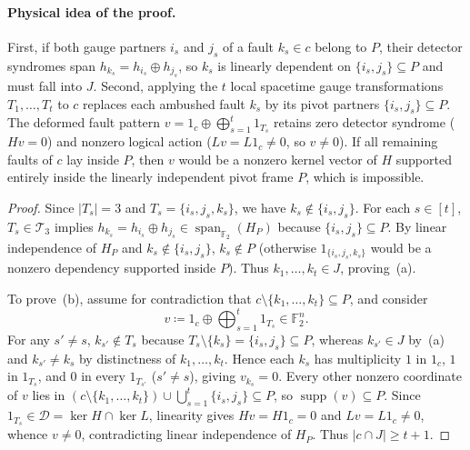 \documentclass[12pt]{article}
\theoremstyle{definition}
\newcommand{\Ftwo}{\mathbb{F}_2}
\DeclareMathOperator{\supp}{supp}
\newcommand{\Dc}{\mathcal{D}}
\newcommand{\Tc}{\mathcal{T}_3}
\begin{document}
\paragraph{Physical idea of the proof.}
First, if both gauge partners $i_s$ and $j_s$ of a fault $k_s \in c$ belong to $P$, their detector syndromes span
$h_{k_s} = h_{i_s} \oplus h_{j_s}$, so $k_s$ is linearly dependent on $\{i_s, j_s\} \subseteq P$ and must fall into
$J$. Second, applying the $t$ local spacetime gauge transformations $T_1, \dots, T_t$ to $c$ replaces each ambushed
fault $k_s$ by its pivot partners $\{i_s, j_s\} \subseteq P$. The deformed fault pattern $v = 1_c \oplus
\bigoplus_{s=1}^t 1_{T_s}$ retains zero detector syndrome ($H v = 0$) and nonzero logical action ($L v = L 1_c \neq
0$, so $v \neq 0$). If all remaining faults of $c$ lay inside $P$, then $v$ would be a nonzero kernel vector of $H$
supported entirely inside the linearly independent pivot frame $P$, which is impossible.

\begin{proof}
Since $|T_s| = 3$ and $T_s = \{i_s, j_s, k_s\}$, we have $k_s \notin \{i_s, j_s\}$. For each $s \in [t]$, $T_s \in
\Tc$ implies $h_{k_s} = h_{i_s} \oplus h_{j_s} \in \operatorname{span}_{\Ftwo}(H_P)$ because $\{i_s, j_s\}
\subseteq P$. By linear independence of $H_P$ and $k_s \notin \{i_s, j_s\}$, $k_s \notin P$ (otherwise
$1_{\{i_s, j_s, k_s\}}$ would be a nonzero dependency supported inside $P$). Thus $k_1, \dots, k_t \in J$,
proving~(a).

To prove~(b), assume for contradiction that $c \setminus \{k_1, \dots, k_t\} \subseteq P$, and consider
\[
  v \coloneqq 1_c \oplus \bigoplus_{s=1}^t 1_{T_s} \in \Ftwo^n.
\]
For any $s' \neq s$, $k_{s'} \notin T_s$ because $T_s \setminus \{k_s\} = \{i_s, j_s\} \subseteq P$, whereas
$k_{s'} \in J$ by~(a) and $k_{s'} \neq k_s$ by distinctness of $k_1, \dots, k_t$. Hence each $k_s$ has multiplicity
$1$ in $1_c$, $1$ in $1_{T_s}$, and $0$ in every $1_{T_{s'}}$ ($s' \neq s$), giving $v_{k_s} = 0$. Every other
nonzero coordinate of $v$ lies in $(c \setminus \{k_1, \dots, k_t\}) \cup \bigcup_{s=1}^t \{i_s, j_s\} \subseteq
P$, so $\supp(v) \subseteq P$. Since $1_{T_s} \in \Dc = \ker H \cap \ker L$, linearity gives $H v = H 1_c = 0$ and
$L v = L 1_c \neq 0$, whence $v \neq 0$, contradicting linear independence of $H_P$. Thus $|c \cap J| \ge t + 1$.
\end{proof}
\end{document}
